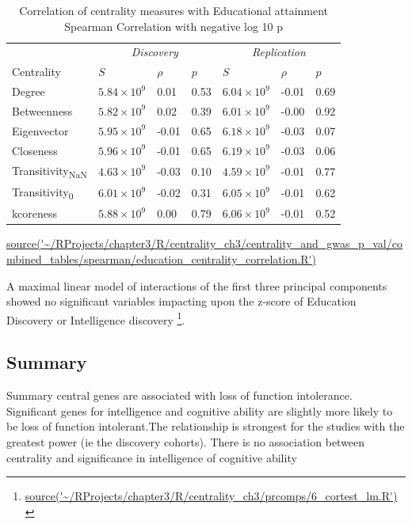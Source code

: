 \begin{table}[ht]
\centering
\setlength{\extrarowheight}{2pt}
\begin{tabular}{l@{\hskip 20pt}lll@{\hskip 20pt}lll}

  \toprule
  &  \multicolumn{3}{c}{\textit{Discovery}} & \multicolumn{3}{c}{\textit{Replication}} \\
  \cmidrule{2-7}
Centrality & $S$ & $\rho$ & $p$ & $S$ & $\rho$ & $p$ \\ 
  \midrule
Degree & $5.84 \times 10^{9}$ & 0.01 & 0.53 & $6.04 \times 10^{9}$ & -0.01 & 0.69 \\ 
  Betweenness & $5.82 \times 10^{9}$ & 0.02 & 0.39 & $6.01 \times 10^{9}$ & -0.00 & 0.92 \\ 
  Eigenvector & $5.95 \times 10^{9}$ & -0.01 & 0.65 & $6.18 \times 10^{9}$ & -0.03 & 0.07 \\ 
  Closeness & $5.96 \times 10^{9}$ & -0.01 & 0.65 & $6.19 \times 10^{9}$ & -0.03 & 0.06 \\ 
  Transitivity\textsubscript{NaN} & $4.63 \times 10^{9}$ & -0.03 & 0.10 & $4.59 \times 10^{9}$ & -0.01 & 0.77 \\ 
  Transitivity\textsubscript{0} & $6.01 \times 10^{9}$ & -0.02 & 0.31 & $6.05 \times 10^{9}$ & -0.01 & 0.62 \\ 
  kcoreness & $5.88 \times 10^{9}$ & 0.00 & 0.79 & $6.06 \times 10^{9}$ & -0.01 & 0.52 \\ 
   \bottomrule
\end{tabular}
\caption[Correlation of centrality measures with educational attainment]{Correlation of centrality measures with Educational attainment Spearman Correlation with negative log 10 p}
\tiny\url{source('~/RProjects/chapter3/R/centrality_ch3/centrality_and_gwas_p_val/combined_tables/spearman/education_centrality_correlation.R')}
\label{tab:Education Spearman Correlation}
\end{table}

A maximal linear model of interactions of the first three principal components showed no significant variables impacting upon the  z-score of Education Discovery or Intelligence discovery \footnote{\url{source('~/RProjects/chapter3/R/centrality_ch3/prcomps/6_cortest_lm.R')}}.

\subsection{Summary}
Summary central genes are associated with loss of function intolerance. Significant genes for intelligence and cognitive ability are slightly more likely to be loss of function intolerant.The relationship is strongest for the studies with the greatest power (ie the discovery cohorts).  There is no association between centrality and significance in intelligence of cognitive ability















